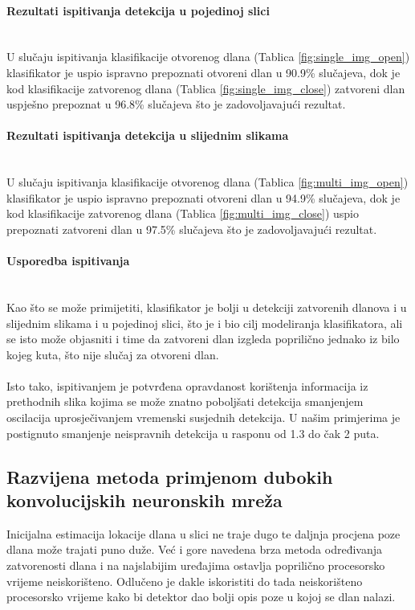 \documentclass[times, utf8, diplomski, numeric]{fer}
\begin{document}
\paragraph{Rezultati ispitivanja detekcija u pojedinoj slici}\mbox{}\\
U slučaju ispitivanja klasifikacije otvorenog dlana (Tablica \ref{fig:single_img_open}) klasifikator je uspio ispravno prepoznati otvoreni dlan u 90.9\% slučajeva, dok je kod klasifikacije zatvorenog dlana (Tablica \ref{fig:single_img_close}) zatvoreni dlan uspješno prepoznat u 96.8\% slučajeva što je zadovoljavajući rezultat.
\paragraph{Rezultati ispitivanja detekcija u slijednim slikama}\mbox{}\\
U slučaju ispitivanja klasifikacije otvorenog dlana (Tablica \ref{fig:multi_img_open}) klasifikator je uspio ispravno prepoznati otvoreni dlan u 94.9\% slučajeva, dok je kod klasifikacije zatvorenog dlana (Tablica \ref{fig:multi_img_close}) uspio prepoznati zatvoreni dlan u 97.5\% slučajeva što je zadovoljavajući rezultat.
\paragraph{Usporedba ispitivanja}\mbox{}\\
Kao što se može primijetiti, klasifikator je bolji u detekciji zatvorenih dlanova i u slijednim slikama i u pojedinoj slici, što je i bio cilj modeliranja klasifikatora, ali se isto može objasniti i time da zatvoreni dlan izgleda poprilično jednako iz bilo kojeg kuta, što nije slučaj za otvoreni dlan.\\\\
Isto tako, ispitivanjem je potvrđena opravdanost korištenja informacija iz prethodnih slika kojima se može znatno poboljšati detekcija smanjenjem oscilacija uprosječivanjem vremenski susjednih detekcija. U našim primjerima je postignuto smanjenje neispravnih detekcija u rasponu od 1.3 do čak 2 puta. 

\subsection{Razvijena metoda primjenom dubokih konvolucijskih neuronskih mreža}

Inicijalna estimacija lokacije dlana u slici ne traje dugo te daljnja procjena poze dlana može trajati puno duže. Već i gore navedena brza metoda određivanja zatvorenosti dlana i na najslabijim uređajima ostavlja poprilično procesorsko vrijeme neiskorišteno. Odlučeno je dakle iskoristiti do tada neiskorišteno procesorsko vrijeme kako bi detektor dao bolji opis poze u kojoj se dlan nalazi.
\end{document}
